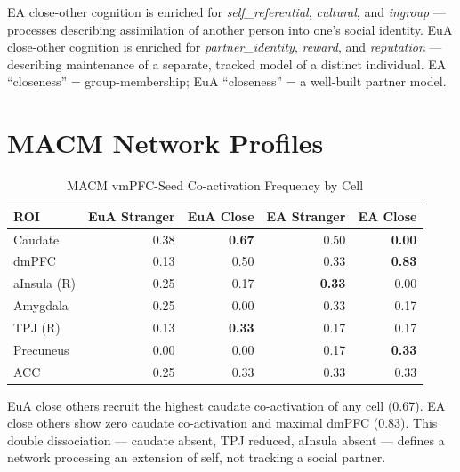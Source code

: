 \documentclass[11pt,a4paper]{report}
\begin{document}
EA close-other cognition is enriched for \emph{self\_referential}, \emph{cultural}, and
\emph{ingroup} --- processes describing assimilation of another person into one's social
identity. EuA close-other cognition is enriched for \emph{partner\_identity}, \emph{reward},
and \emph{reputation} --- describing maintenance of a separate, tracked model of a distinct
individual. EA ``closeness'' = group-membership; EuA ``closeness'' = a well-built partner model.

\section*{MACM Network Profiles}

\begin{table}[ht]
\centering\small
\caption{MACM vmPFC-Seed Co-activation Frequency by Cell}
\label{tab:macm2x2}
\begin{tabular}{lrrrr}
\toprule
\textbf{ROI} &
\textcolor{euaBlue}{\textbf{EuA Stranger}} &
\textcolor{euaBlue}{\textbf{EuA Close}} &
\textcolor{eaRed}{\textbf{EA Stranger}} &
\textcolor{eaRed}{\textbf{EA Close}} \\
\midrule
Caudate      & 0.38 & \textbf{0.67} & 0.50          & \textbf{0.00} \\
dmPFC        & 0.13 & 0.50          & 0.33          & \textbf{0.83} \\
aInsula (R)  & 0.25 & 0.17          & \textbf{0.33} & 0.00          \\
Amygdala     & 0.25 & 0.00          & 0.33          & 0.17          \\
TPJ (R)      & 0.13 & \textbf{0.33} & 0.17          & 0.17          \\
Precuneus    & 0.00 & 0.00          & 0.17          & \textbf{0.33} \\
ACC          & 0.25 & 0.33          & 0.33          & 0.33          \\
\bottomrule
\end{tabular}
\end{table}

\textcolor{euaBlue}{EuA close others} recruit the highest caudate co-activation of any cell
(0.67). \textcolor{eaRed}{EA close others} show zero caudate co-activation and maximal dmPFC
(0.83). This double dissociation --- caudate absent, TPJ reduced, aInsula absent --- defines
a network processing an extension of self, not tracking a social partner.

\end{document}
